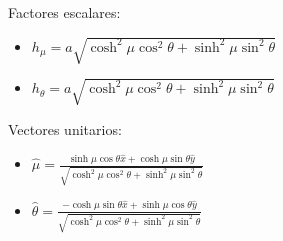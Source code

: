 \bigbreak
Factores escalares:
\begin{itemize}
    \item $h_\mu = a\sqrt{\cosh^2{\mu}\cos^2{\theta}
    +\sinh^2{\mu}\sin^2{\theta}}$
    \item $h_\theta = a\sqrt{\cosh^2{\mu}\cos^2{\theta}
    +\sinh^2{\mu}\sin^2{\theta}}$
\end{itemize}
\bigbreak
Vectores unitarios:

\begin{itemize}
    \item $\hat{\mu}=\frac{\sinh{\mu}\cos{\theta}\hat{x}+\cosh{\mu}\sin{\theta}\hat{y}}{\sqrt{\cosh^2{\mu}\cos^2{\theta}
    +\sinh^2{\mu}\sin^2{\theta}}}$
    \item $\hat{\theta}=\frac{-\cosh{\mu}\sin{\theta}\hat{x}+\sinh{\mu}\cos{\theta}\hat{y}}{\sqrt{\cosh^2{\mu}\cos^2{\theta}+\sinh^2{\mu}\sin^2{\theta}}}$
\end{itemize}

\bigbreak











    
    
    

\newpage